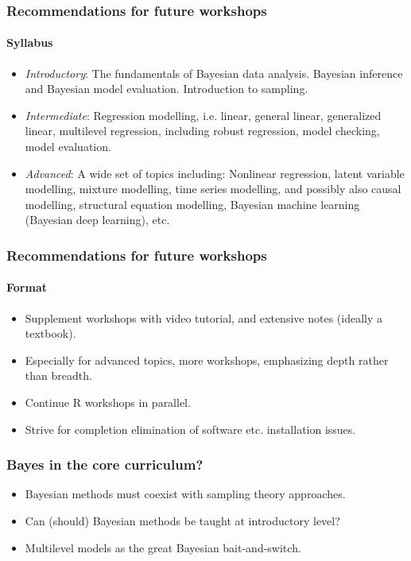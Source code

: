 \begin{frame}
	\frametitle{Recommendations for future workshops}
	\framesubtitle{Syllabus}

	\begin{itemize}

		\item \emph{Introductory}: The fundamentals of Bayesian data analysis. Bayesian inference and Bayesian model evaluation. Introduction to sampling.
		\item \emph{Intermediate}: Regression modelling, i.e. linear, general linear, generalized linear, multilevel regression, including robust regression, model checking, model evaluation.
		\item \emph{Advanced}:  A wide set of topics including: Nonlinear regression, latent variable modelling, mixture modelling, time series modelling, and possibly also causal modelling, structural equation modelling, Bayesian machine learning (Bayesian deep learning), etc.
	\end{itemize}


\end{frame}


\begin{frame}
	\frametitle{Recommendations for future workshops}
	\framesubtitle{Format}

	\begin{itemize}
		\item Supplement workshops with video tutorial, and extensive notes (ideally a textbook).
		\item Especially for advanced topics, more workshops, emphasizing depth rather than breadth.
		\item Continue R workshops in parallel.
		\item Strive for completion elimination of software etc. installation issues.
	\end{itemize}

\end{frame}


\begin{frame}
	\frametitle{Bayes in the core curriculum?}

	\begin{itemize}
		\item Bayesian methods must coexist with sampling theory approaches. 
		\item Can (should) Bayesian methods be taught at introductory level?
		\item Multilevel models as the great Bayesian bait-and-switch.
	\end{itemize}

\end{frame}

